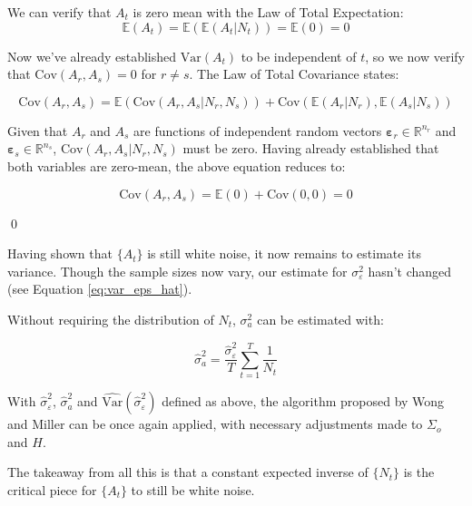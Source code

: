We can verify that $A_t$ is zero mean with the Law of Total Expectation:
$$ \mathbb{E}(A_t) = \mathbb{E}(\mathbb{E}(A_t|N_t)) = \mathbb{E}(0) = 0 $$

Now we've already established $\text{Var}(A_t)$ to be independent of $t$, so we now 
verify that $\text{Cov}(A_r,A_s) = 0$ for $r \neq s$. The Law of Total Covariance states:


$$ \text{Cov}(A_r,A_s) = \mathbb{E}(\text{Cov}(A_r,A_s|N_r,N_s)) + \text{Cov}(\mathbb{E}(A_r|N_r), \mathbb{E}(A_s|N_s))$$

Given that $A_r$ and $A_s$ are functions of independent random vectors $\bm{\varepsilon}_r \in \mathbb{R}^{n_r}$ and $\bm{\varepsilon}_s \in \mathbb{R}^{n_s}$, $\text{Cov}(A_r,A_s|N_r,N_s)$ must be zero. Having already established that both variables are zero-mean, the above equation reduces to:

$$ \text{Cov}(A_r,A_s) = \mathbb{E}(0) + \text{Cov}(0, 0) = 0$$

\qed

Having shown that $\{A_t\}$ is still white noise, it now remains to estimate its variance. 
Though the sample sizes now vary, our estimate for $\sigma_\varepsilon^2$ hasn't changed (see Equation \ref{eq:var_eps_hat}).




Without requiring the distribution of $N_t$, $\sigma_a^2$ can be estimated with:

\begin{equation}
    \label{eq:var_a_n}
    \hat{\sigma}_a^2 = \frac{\hat{\sigma}_\varepsilon^2}{T}\sum_{t=1}^T\frac{1}{N_t}
\end{equation}

With $\hat{\sigma}_\varepsilon^2$, $\hat{\sigma}_a^2$ and $\hat{\text{Var}}(\hat{\sigma}_\varepsilon^2)$ defined as above, the algorithm proposed by Wong and Miller can be once again applied, with necessary adjustments made to $\Sigma_o$ and $H$. 










The takeaway from all this is that a constant expected inverse of $\{N_t\}$ is the critical piece for $\{A_t\}$ to still be white noise.

